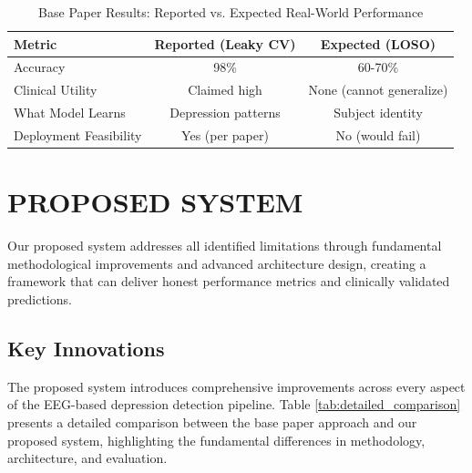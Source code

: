 \begin{table}[H]
    \centering
    \small
    \caption{Base Paper Results: Reported vs. Expected Real-World Performance}
    \label{tab:base_real_performance}
    \begin{tabularx}{\textwidth}{|X|c|c|}
        \hline
        \textbf{Metric} & \textbf{Reported (Leaky CV)} & \textbf{Expected (LOSO)} \\
        \hline
        Accuracy & 98\% & 60-70\% \\
        \hline
        Clinical Utility & Claimed high & None (cannot generalize) \\
        \hline
        What Model Learns & Depression patterns & Subject identity \\
        \hline
        Deployment Feasibility & Yes (per paper) & No (would fail) \\
        \hline
    \end{tabularx}
\end{table}

\section{PROPOSED SYSTEM}

Our proposed system addresses all identified limitations through fundamental methodological improvements and advanced architecture design, creating a framework that can deliver honest performance metrics and clinically validated predictions.

\subsection{Key Innovations}

The proposed system introduces comprehensive improvements across every aspect of the EEG-based depression detection pipeline. Table \ref{tab:detailed_comparison} presents a detailed comparison between the base paper approach and our proposed system, highlighting the fundamental differences in methodology, architecture, and evaluation.

